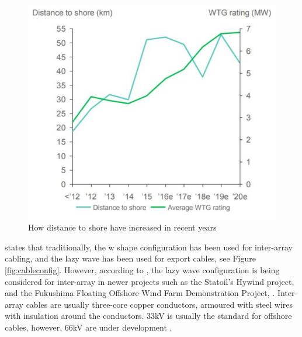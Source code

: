 \begin{figure}[H]
\centering
\includegraphics[scale=0.9]{figures/distshore}
\caption[$\; \:$Distance to shore ]{How distance to shore have increased in recent years \cite{Make2016}}
 \label{fig:distshore}
\end{figure}

\noindent \cite{srinil2016} states that traditionally, the w shape configuration has been used for inter-array cabling, and the lazy wave has been used for export cables, see Figure \ref{fig:cableconfig}. However, according to \cite{ds2010}, the lazy wave configuration is being considered for inter-array in newer projects such as the Statoil's Hywind project, and the Fukushima Floating Offshore Wind
Farm Demonstration Project, \cite{yagihashi2015dynamic}. Inter-array cables are usually three-core copper conductors, armoured with steel wires with insulation around the conductors. 33kV is usually the standard for offshore cables, however, 66kV are under development \cite{srinil2016}. 



